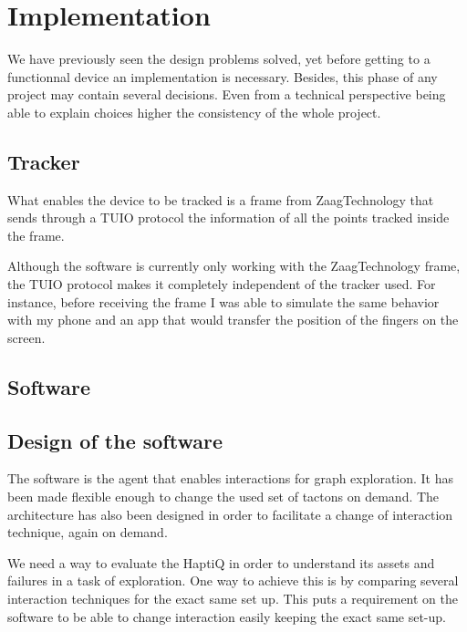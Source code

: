 \chapter{Implementation}

We have previously seen the design problems solved, yet before getting to a functionnal device an implementation is necessary. Besides, this phase of any project may contain several decisions. Even from a technical perspective being able to explain choices higher the consistency of the whole project.


\section{Tracker}\label{tracker}

What enables the device to be tracked is a frame from ZaagTechnology
that sends through a TUIO protocol the information of all the points
tracked inside the frame.

Although the software is currently only working with the ZaagTechnology
frame, the TUIO protocol makes it completely independent of the tracker
used. For instance, before receiving the frame I was able to simulate
the same behavior with my phone and an app that would transfer the position of the fingers on the screen.


\section{Software}\label{software}


\section{Design of the software}\label{design-of-the-software}

The software is the agent that enables interactions for graph
exploration. It has been made flexible enough to change the used set of
tactons on demand. The architecture has also been designed in order to
facilitate a change of interaction technique, again on demand.

We need a way to evaluate the HaptiQ in order to understand its assets
and failures in a task of exploration. One way to achieve this is by
comparing several interaction techniques for the exact same set up. This
puts a requirement on the software to be able to change interaction
easily keeping the exact same set-up.

